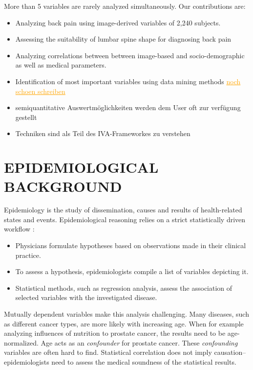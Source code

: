 \documentclass[a4paper,twoside]{style/article}
\newcommand{\com}[1]{\textcolor{orange}{\uline{#1}}}
\begin{document}
More than 5 variables are rarely analyzed simultaneously.
Our contributions are:
\begin{itemize}
	\item Analyzing back pain using image-derived variables of 2,240 subjects.
	\item Assessing the suitability of lumbar spine shape for diagnosing back pain
	\item Analyzing correlations between between image-based and socio-demographic as well as medical parameters.
	\item Identification of most important variables using data mining methods \com{noch schoen schreiben}
	\item semiquantitative Auswertmöglichkeiten werden dem User oft zur verfügung gestellt
	\item Techniken sind als Teil des IVA-Frameworkes zu verstehen
\end{itemize}

\section{\uppercase{Epidemiological Background}}
\label{sec:EpidemiologicalBackground}
\noindent Epidemiology is the study of dissemination, causes and results of health-related states and events.
Epidemiological reasoning relies on a strict statistically driven workflow \cite{Fletcher}:
\begin{itemize}
	\item Physicians formulate hypotheses based on observations made in their clinical practice.
	\item To assess a hypothesis, epidemiologists compile a list of variables depicting it.
	\item Statistical methods, such as regression analysis, assess the association of selected variables with the investigated disease.
\end{itemize}
Mutually dependent variables make this analysis challenging.
Many diseases, such as different cancer types, are more likely with increasing age.
When for example analyzing influences of nutrition to prostate cancer, the results need to be age-normalized.
Age acts as an \emph{confounder} for prostate cancer.
These \emph{confounding} variables are often hard to find.
Statistical correlation does not imply causation--epidemiologists need to assess the medical soundness of the statistical results.
\end{document}
